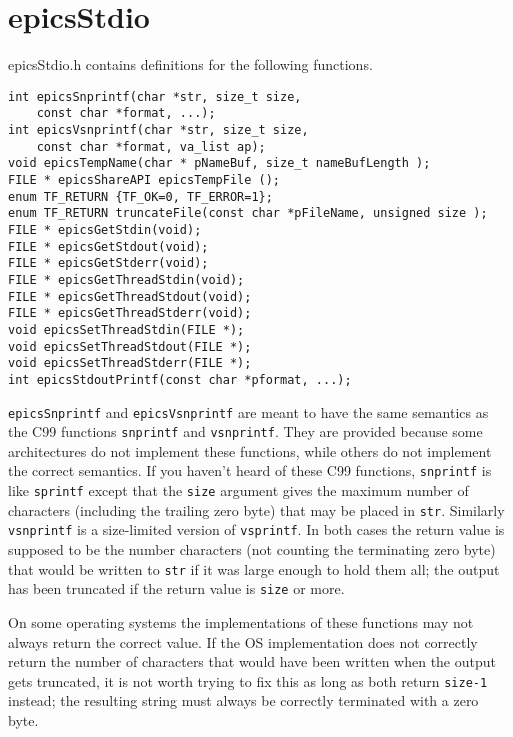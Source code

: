 \section{epicsStdio}

epicsStdio.h contains definitions for the following functions.

\begin{verbatim}
int epicsSnprintf(char *str, size_t size,
    const char *format, ...);
int epicsVsnprintf(char *str, size_t size,
    const char *format, va_list ap);
void epicsTempName(char * pNameBuf, size_t nameBufLength );
FILE * epicsShareAPI epicsTempFile ();
enum TF_RETURN {TF_OK=0, TF_ERROR=1};
enum TF_RETURN truncateFile(const char *pFileName, unsigned size );
FILE * epicsGetStdin(void);
FILE * epicsGetStdout(void);
FILE * epicsGetStderr(void);
FILE * epicsGetThreadStdin(void);
FILE * epicsGetThreadStdout(void);
FILE * epicsGetThreadStderr(void);
void epicsSetThreadStdin(FILE *);
void epicsSetThreadStdout(FILE *);
void epicsSetThreadStderr(FILE *);
int epicsStdoutPrintf(const char *pformat, ...);
\end{verbatim}

\verb|epicsSnprintf| and \verb|epicsVsnprintf| are meant to have the same semantics as the C99 functions \verb|snprintf| and 
\verb|vsnprintf|. They are provided because some architectures do not implement these functions, while others do not 
implement the correct semantics. If you haven't heard of these C99 functions, \verb|snprintf| is like \verb|sprintf| except that 
the \verb|size| argument gives the maximum number of characters (including the trailing zero byte) that may be placed in \verb|str|. 
Similarly \verb|vsnprintf| is a size-limited version of \verb|vsprintf|. In both cases the return value is supposed to be the 
number characters (not counting the terminating zero byte) that would be written to \verb|str| if it was large enough to hold 
them all; the output has been truncated if the return value is \verb|size| or more.

On some operating systems the implementations of these functions may not always return the correct value. If the OS 
implementation does not correctly return the number of characters that would have been written when the output gets 
truncated, it is not worth trying to fix this as long as both return \verb|size-1| instead; the resulting string must always be 
correctly terminated with a zero byte.

